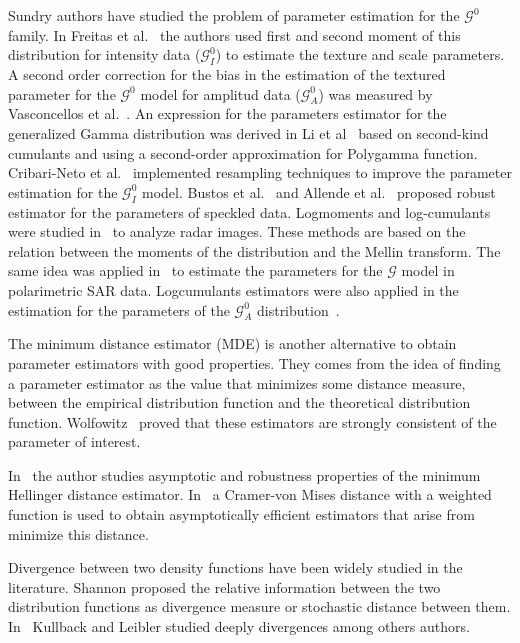 \documentclass[journal]{IEEEtran}
\numberwithin{equation}{section}
\begin{document}
Sundry authors have studied the problem of parameter estimation for the $\mathcal G^0$ family. In Freitas et al.~\cite{Freitas2005} the authors used first and second moment of this distribution for intensity data ($\mathcal G_I^0$) to estimate the texture and scale parameters. A second order correction for the bias in the estimation of the textured parameter for the $\mathcal G^0$ model for amplitud data ($\mathcal G_A^0$) was measured by Vasconcellos et al.~\cite{VasconcellosFrerySilva:CompStat}.  An  expression for the parameters estimator for the generalized Gamma distribution was derived in Li et al~\cite{Li2011} based on second-kind cumulants and using a second-order approximation  for  Polygamma  function. Cribari-Neto et al.~\cite{CribariFrerySilva:CSDA} implemented resampling techniques to improve the parameter estimation for the $\mathcal G_I^0$ model. Bustos et al.~\cite{BustosFreryLucini:Mestimators:2001} and Allende et al.~\cite{AllendeFreryetal:JSCS:05} proposed robust estimator for the parameters of speckled data. Logmoments and log-cumulants were studied in~\cite{nicolas2002} to analyze radar images. These methods are based on the relation between the moments of the distribution and the Mellin transform. The same idea was applied in~\cite{khan2014} to estimate the parameters for the $\mathcal{G}$ model in polarimetric SAR data. Logcumulants estimators were also applied in the estimation for the parameters of the $\mathcal G_A^0$ distribution~\cite{Tison2004}. 

The minimum distance estimator (MDE) is another alternative to obtain parameter estimators with good properties. They comes from the idea of finding a parameter estimator as the value that minimizes some  distance measure, between the empirical  distribution function and  the  theoretical distribution function. Wolfowitz~\cite{wolfowitz1953,wolfowitz1957} proved that these estimators are strongly consistent of the parameter of interest.

In~\cite{beran1977} the author studies asymptotic and robustness properties of the minimum Hellinger distance estimator. In~\cite{Boos1981} a Cramer-von Mises distance with a weighted function is used to obtain asymptotically efficient estimators that arise from minimize this distance.

Divergence between two density functions have been widely studied in the literature. Shannon proposed the relative information between the
two distribution functions as divergence measure or stochastic distance between them. In~\cite{KullbackBook1968,KullbackLeibler1951} Kullback and Leibler studied deeply divergences among others authors. 
\end{document}
